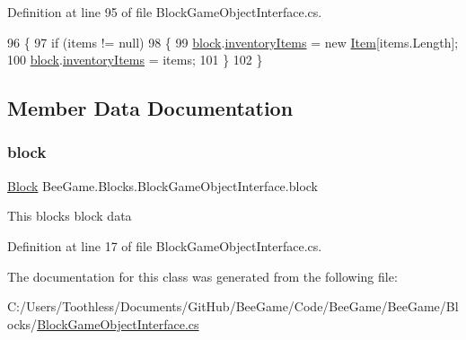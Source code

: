 Definition at line 95 of file Block\+Game\+Object\+Interface.\+cs.


\begin{DoxyCode}
96         \{
97             \textcolor{keywordflow}{if} (items != null)
98             \{
99                 \hyperlink{class_bee_game_1_1_blocks_1_1_block_game_object_interface_a238bad3b956ec84c8b1cc3127948b75d}{block}.\hyperlink{class_bee_game_1_1_blocks_1_1_block_a54846c7c7ec2f512484b3060de977fac}{inventoryItems} = \textcolor{keyword}{new} \hyperlink{struct_bee_game_1_1_items_1_1_item}{Item}[items.Length];
100                 \hyperlink{class_bee_game_1_1_blocks_1_1_block_game_object_interface_a238bad3b956ec84c8b1cc3127948b75d}{block}.\hyperlink{class_bee_game_1_1_blocks_1_1_block_a54846c7c7ec2f512484b3060de977fac}{inventoryItems} = items;
101             \}
102         \}
\end{DoxyCode}


\subsection{Member Data Documentation}
\mbox{\label{class_bee_game_1_1_blocks_1_1_block_game_object_interface_a238bad3b956ec84c8b1cc3127948b75d}} 
\subsubsection{\texorpdfstring{block}{block}}
{\footnotesize\ttfamily \hyperlink{class_bee_game_1_1_blocks_1_1_block}{Block} Bee\+Game.\+Blocks.\+Block\+Game\+Object\+Interface.\+block}



This blocks block data 



Definition at line 17 of file Block\+Game\+Object\+Interface.\+cs.



The documentation for this class was generated from the following file\+:\begin{DoxyCompactItemize}
\item 
C\+:/\+Users/\+Toothless/\+Documents/\+Git\+Hub/\+Bee\+Game/\+Code/\+Bee\+Game/\+Bee\+Game/\+Blocks/\hyperlink{_block_game_object_interface_8cs}{Block\+Game\+Object\+Interface.\+cs}\end{DoxyCompactItemize}
